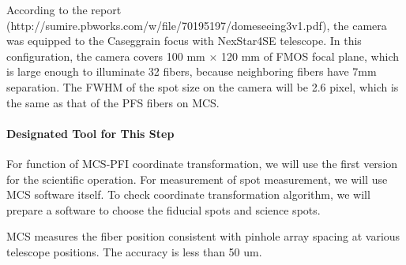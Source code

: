 According to the report (http://sumire.pbworks.com/w/file/70195197/domeseeing3v1.pdf), the camera was equipped to the Caseggrain focus with NexStar4SE telescope.
In this configuration, the camera covers 100 mm $\times$ 120 mm of FMOS focal plane, which is large enough to illuminate 32 fibers, because neighboring fibers have 7mm separation.
The FWHM of the spot size on the camera will be 2.6 pixel, which is the same as that of the PFS fibers on MCS.

\paragraph{Designated Tool for This Step}
For function of MCS-PFI coordinate transformation, we will use the first version for the scientific operation.
For measurement of spot measurement, we will use MCS software itself.
To check coordinate transformation algorithm, we will prepare a software to choose the fiducial spots and science spots.

\begin{itembox}[l]{}
MCS measures the fiber position consistent with pinhole array spacing at various telescope positions. 
The accuracy is less than 50 um.

\end{itembox}